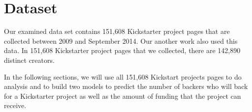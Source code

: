 \section{Dataset}
Our examined data set contains 151,608 Kickstarter project pages that are collected between 2009 and September 2014. Our another work \cite{chung2015long} also used this data. In 151,608 Kickstarter project pages that we collected, there are 142,890 distinct creators.

In the following sections, we will use all 151,608 Kickstart projects pages to do analysis and to build two models to predict the number of backers who will back for a Kickstarter project as well as the amount of funding that the project can receive.